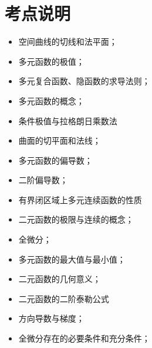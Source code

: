 \section{考点说明}
\begin{itemize}
\item 空间曲线的切线和法平面；
\item 多元函数的极值；
\item 多元复合函数、隐函数的求导法则；
\item 多元函数的概念；
\item 条件极值与拉格朗日乘数法
\item 曲面的切平面和法线；
\item 多元函数的偏导数；
\item 二阶偏导数；
\item 有界闭区域上多元连续函数的性质
\item 二元函数的极限与连续的概念；
\item 全微分；
\item 多元函数的最大值与最小值；
\item 二元函数的几何意义；
\item 二元函数的二阶泰勒公式
\item 方向导数与梯度；
\item 全微分存在的必要条件和充分条件；
\end{itemize}

